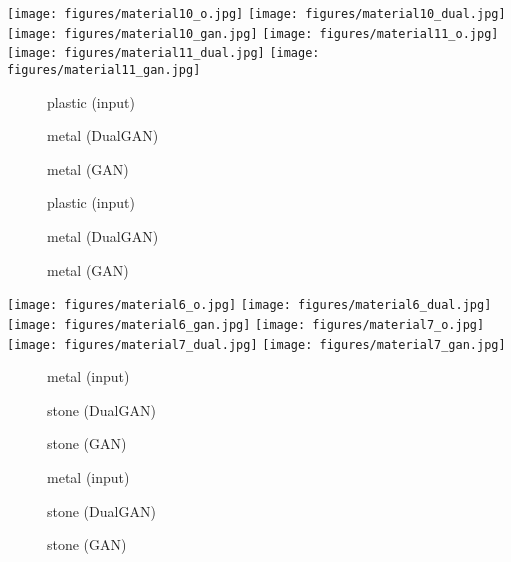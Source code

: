 \begin{figure*}
\begin{center}

\texttt{[image: figures/material10\_o.jpg]}
\texttt{[image: figures/material10\_dual.jpg]}
\texttt{[image: figures/material10\_gan.jpg]}
\texttt{[image: figures/material11\_o.jpg]}
\texttt{[image: figures/material11\_dual.jpg]}
\texttt{[image: figures/material11\_gan.jpg]}

\begin{subfigure}[]{0.13\linewidth}\caption*{plastic (input)}\end{subfigure}
\begin{subfigure}[]{0.14\linewidth}\caption*{metal (DualGAN)}\end{subfigure}
\begin{subfigure}[]{0.13\linewidth}\caption*{metal (GAN)}\end{subfigure}
\begin{subfigure}[]{0.13\linewidth}\caption*{plastic (input)}\end{subfigure}
\begin{subfigure}[]{0.14\linewidth}\caption*{metal (DualGAN)}\end{subfigure}
\begin{subfigure}[]{0.13\linewidth}\caption*{metal (GAN)}\end{subfigure}

\texttt{[image: figures/material6\_o.jpg]}
\texttt{[image: figures/material6\_dual.jpg]}
\texttt{[image: figures/material6\_gan.jpg]}
\texttt{[image: figures/material7\_o.jpg]}
\texttt{[image: figures/material7\_dual.jpg]}
\texttt{[image: figures/material7\_gan.jpg]}

\begin{subfigure}[]{0.13\linewidth}\caption*{metal (input)}\end{subfigure}
\begin{subfigure}[]{0.13\linewidth}\caption*{stone (DualGAN)}\end{subfigure}
\begin{subfigure}[]{0.13\linewidth}\caption*{stone (GAN)}\end{subfigure}
\begin{subfigure}[]{0.13\linewidth}\caption*{metal (input)}\end{subfigure}
\begin{subfigure}[]{0.13\linewidth}\caption*{stone (DualGAN)}\end{subfigure}
\begin{subfigure}[]{0.13\linewidth}\caption*{stone (GAN)}\end{subfigure}


\end{center}
\end{figure*}
